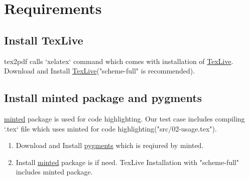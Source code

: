 \section{Requirements}

\subsection{Install TexLive}
tex2pdf calls `xelatex` command which comes with installation of \href{https://tug.org/texlive/}{TexLive}.
Download and Install \href{https://tug.org/texlive/}{TexLive}("scheme-full" is recommended).

\subsection{Install minted package and pygments}
\href{https://www.ctan.org/pkg/minted}{minted} package is used for code highlighting.
Our test case includes compiling `.tex` file which uses minted for code highlighting("src/02-usage.tex").

\begin{enumerate}
  \item Download and Install \href{https://pygments.org/download/}{pygments} which is reqiured by minted.
  \item Install \href{https://www.ctan.org/pkg/minted}{minted} package is if need. TexLive Installation with "scheme-full" includes minted package.
\end{enumerate}

